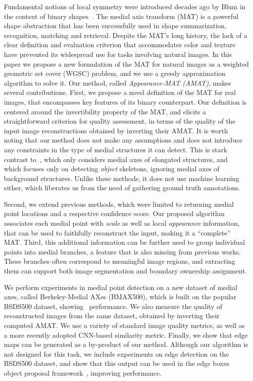 \documentclass[10pt,twocolumn,letterpaper]{article}
\begin{document}
Fundamental notions of local symmetry were introduced decades ago by Blum in the context 
of binary shapes~\cite{blum1967transformation,blum1973biological}.
The medial axis transform (MAT) is a powerful shape abstraction that has been successfully
used in shape summarization, recognition, matching and retrieval. 
Despite the MAT's long history, the lack of a clear definition and evaluation criterion 
that accommodates color and texture have prevented its widespread use for tasks involving natural images.
In this paper we propose a new formulation of the MAT for natural images as a 
weighted geometric set cover (WGSC) problem, and we use a greedy approximation algorithm to solve it.
Our method, called \emph{Appearance-MAT (AMAT)}, makes several contributions.
First, we propose a novel definition of the MAT for real images, that encompasses key features of its 
binary counterpart. Our definition is centered around the invertibility property of the MAT, and elicits 
a straightforward criterion for quality assessment, in terms of the quality of the input image reconstructions
obtained by inverting their AMAT.
It is worth noting that our method does not make any assumptions and does not introduce any constraints in the
type of medial structures it can detect.
This is stark contrast to~\cite{tsogkas2012learning}, which only considers medial axes of elongated structures,
and~\cite{shen2016object} which focuses only on detecting \emph{object} skeletons, ignoring medial axes of 
background structures.
Unlike these methods, it does not use machine learning either, which liberates us from the need of gathering
ground truth annotations.

Second, we extend previous methods, which were limited to returning medial point locations and a respective confidence score.
Our proposed algorithm associates each medial point with \emph{scale} as well as local \emph{appearance} information,
that can be used to faithfully reconstruct the input, making it a ``complete'' MAT.
Third, this additional information can be further used to group individual points into medial branches,
a feature that is also missing from previous works.
These branches often correspond to meaningful image regions, and extracting them can support both image segmentation
and boundary ownership assignment.

We perform experiments in medial point detection on a new dataset of medial axes, called
Berkeley-Medial AXes (BMAX500), which is built on the popular BSDS500 dataset, showing \sota\ performance.
We also measure the quality of reconstructed images from the same dataset, obtained by inverting their computed AMAT. 
We use a variety of standard image quality metrics, as well as a more recently adopted CNN-based similarity metric.
Finally, we show that edge maps can be generated as a by-product of our method.
Although our algorithm is not designed for this task, we include experiments on edge detection on the BSDS500 dataset,
and show that this output can be used in the edge boxes object proposal framework~\cite{zitnick2014edge}, improving
performance.
\end{document}
